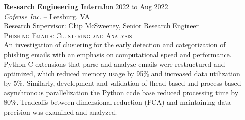 \documentclass[hidelinks, 10pt]{article}
\begin{document}
{{\begin{minipage}[ct]{0.9\linewidth}
\textbf{Research Engineering Intern}\hfill Jun 2022 to Aug 2022\\
\emph{Cofense Inc.} -- Leesburg, VA\\
Research Supervisor: Chip McSweeney, Senior Research Engineer\\
{\textsc{Phishing Emails: Clustering and Analysis}}
\vspace{1mm}\\
An investigation of clustering for the early detection and categorization of
phishing emails with an emphasis on computational speed and performance.  Python
C extensions that parse and analyze emails were restructured and optimized,
which reduced memory usage by 95\% and increased data utilization by 5\%.
Similarly, development and validation of thead-based and process-based
asynchronous parallelization the Python code base reduced processing time by
80\%. Tradeoffs between dimensional reduction (PCA) and maintaining data
precision was examined and analyzed.
\end{minipage}

\vspace{4mm}

}}
\end{document}
